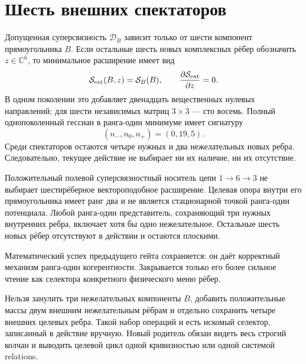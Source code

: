 \section{Шесть внешних спектаторов}

Допущенная суперсвязность $\mathcal D_B$ зависит только от шести
компонент прямоугольника $B$. Если остальные шесть новых комплексных рёбер
обозначить $z\in\mathbb C^6$, то минимальное расширение имеет вид
\begin{equation}
 \mathcal S_{\rm ext}(B,z)=\mathcal S_B(B),
 \qquad \frac{\partial\mathcal S_{\rm ext}}{\partial z}=0.
 \label{eq:v7-full-graph-spectator-action}
\end{equation}
В одном поколении это добавляет двенадцать вещественных нулевых направлений;
для шести независимых матриц $3\times3$ --- сто восемь. Полный
однопоколенный гессиан в ранга-один минимуме имеет сигнатуру
\begin{equation}
 (n_-,n_0,n_+)=(0,19,5).
 \label{eq:v7-full-graph-extended-hessian}
\end{equation}
Среди спектаторов остаются четыре нужных и два нежелательных новых ребра.
Следовательно, текущее действие не выбирает ни их наличие, ни их отсутствие.

\begin{theorem}
Положительный полевой суперсвязностный носитель цепи $1\to6\to3$ не
выбирает шестирёберное вектороподобное расширение. Целевая опора внутри
его прямоугольника имеет ранг два и не является стационарной точкой
ранга-один потенциала. Любой ранга-один представитель, сохраняющий три
нужных внутренних ребра, включает хотя бы одно нежелательное. Остальные
шесть новых рёбер отсутствуют в действии и остаются плоскими.
\end{theorem}

Математический успех предыдущего гейта сохраняется: он даёт корректный
механизм ранга-один когерентности. Закрывается только его более сильное
чтение как селектора конкретного физического меню рёбер.

\begin{nogocriterion}
Нельзя занулить три нежелательных компоненты $B$, добавить положительные
массы двум внешним нежелательным рёбрам и отдельно сохранить четыре внешних
целевых ребра. Такой набор операций и есть искомый селектор, записанный в
действие вручную. Новый родитель обязан видеть весь строгий колчан и
выводить целевой цикл одной кривизностью или одной системой relations.
\end{nogocriterion}

